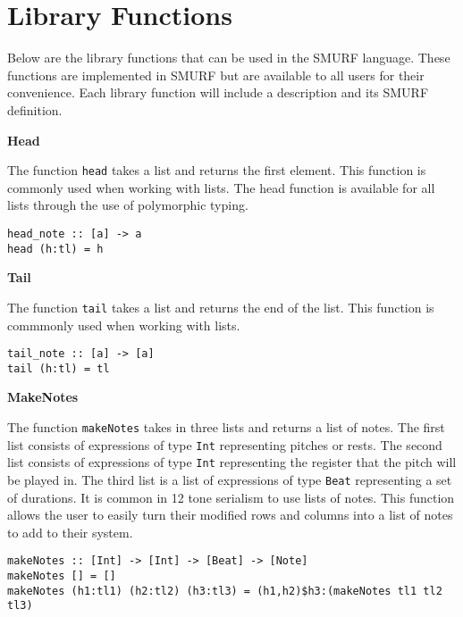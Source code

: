 \section{Library Functions}

Below are the library functions that can be used in the SMURF language. 
These functions are implemented in SMURF but are available to all users 
for their convenience. Each library function will include a description 
and its SMURF definition. \newline

\noindent\textbf{Head}

The function \texttt{head} takes a list and returns the first element. 
This function is commonly used when working with lists. The head function
is available for all lists through the use of polymorphic typing. 

\begin{verbatim}
head_note :: [a] -> a
head (h:tl) = h
\end{verbatim} 


\noindent\textbf{Tail}

The function \texttt{tail} takes a list and returns the end of the list.
This function is commmonly used when working with lists. 

\begin{verbatim}
tail_note :: [a] -> [a]
tail (h:tl) = tl
\end{verbatim} 


\noindent\textbf{MakeNotes}

The function \texttt{makeNotes} takes in three lists and returns a list 
of notes. The first list consists of expressions of type \texttt{Int} representing 
pitches or rests. The second list consists of expressions of type \texttt{Int}
representing the register that the pitch will be played in. The third list is a list 
of expressions of type \texttt{Beat} representing a set of durations. It is common in 
12 tone serialism to use lists of notes. This function allows the user 
to easily turn their modified rows and columns into a list of notes to add 
to their system. 

\begin{verbatim}
makeNotes :: [Int] -> [Int] -> [Beat] -> [Note]
makeNotes [] = []
makeNotes (h1:tl1) (h2:tl2) (h3:tl3) = (h1,h2)$h3:(makeNotes tl1 tl2 tl3)
\end{verbatim}
